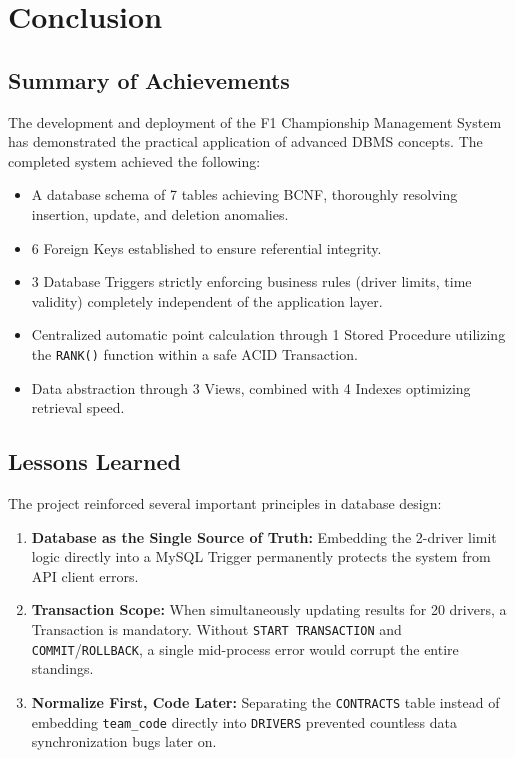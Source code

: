 \documentclass[12pt, a4paper]{report}
\begin{document}
\chapter{Conclusion}

\section{Summary of Achievements}
The development and deployment of the F1 Championship Management System has demonstrated the practical application of advanced DBMS concepts. The completed system achieved the following:
\begin{itemize}
    \item A database schema of 7 tables achieving BCNF, thoroughly resolving insertion, update, and deletion anomalies.
    \item 6 Foreign Keys established to ensure referential integrity.
    \item 3 Database Triggers strictly enforcing business rules (driver limits, time validity) completely independent of the application layer.
    \item Centralized automatic point calculation through 1 Stored Procedure utilizing the \texttt{RANK()} function within a safe ACID Transaction.
    \item Data abstraction through 3 Views, combined with 4 Indexes optimizing retrieval speed.
\end{itemize}

\section{Lessons Learned}
The project reinforced several important principles in database design:
\begin{enumerate}
    \item \textbf{Database as the Single Source of Truth:} Embedding the 2-driver limit logic directly into a MySQL Trigger permanently protects the system from API client errors.
    \item \textbf{Transaction Scope:} When simultaneously updating results for 20 drivers, a Transaction is mandatory. Without \texttt{START TRANSACTION} and \texttt{COMMIT}/\texttt{ROLLBACK}, a single mid-process error would corrupt the entire standings.
    \item \textbf{Normalize First, Code Later:} Separating the \texttt{CONTRACTS} table instead of embedding \texttt{team\_code} directly into \texttt{DRIVERS} prevented countless data synchronization bugs later on.
\end{enumerate}
\end{document}
